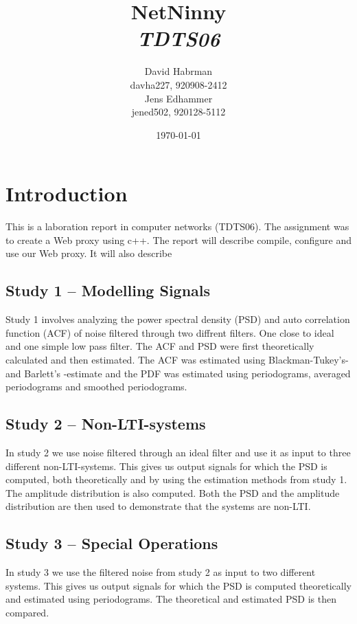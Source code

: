 \documentclass[10pt]{article}
\title{NetNinny\\
\emph{TDTS06}}
\author{David Habrman \\ davha227, 920908-2412\\
Jens Edhammer \\ jened502, 920128-5112 }
\date{\today}
\begin{document}
\maketitle

\newpage
\tableofcontents
\newpage

\section{Introduction}
This is a laboration report in computer networks (TDTS06). The assignment was
to create a Web proxy using c++. The report will describe compile, configure and
use our Web proxy. It will also describe


\subsection{Study 1 – Modelling Signals}
Study 1 involves analyzing the power spectral density (PSD) and auto correlation function (ACF)
of noise filtered through two diffrent filters. One close to ideal and one simple low pass filter.
The ACF and PSD were first theoretically calculated and then estimated.
The ACF was estimated using Blackman-Tukey's- and Barlett's -estimate and the
PDF was estimated using periodograms, averaged periodograms and smoothed periodograms.

\subsection{Study 2 – Non-LTI-systems}
In study 2 we use noise filtered through an ideal filter and use it as input to three different non-LTI-systems.
This gives us output signals for which the PSD is computed, both theoretically and by using the estimation methods
from study 1. The  amplitude distribution is also computed. Both the PSD and the  amplitude distribution are then used
to demonstrate that the systems are non-LTI.

\subsection{Study 3 – Special Operations}
In study 3 we use the filtered noise from study 2 as input to two different systems.
This gives us output signals for which the PSD is computed theoretically and estimated using
periodograms. The theoretical and estimated PSD is then compared.
\end{document}
